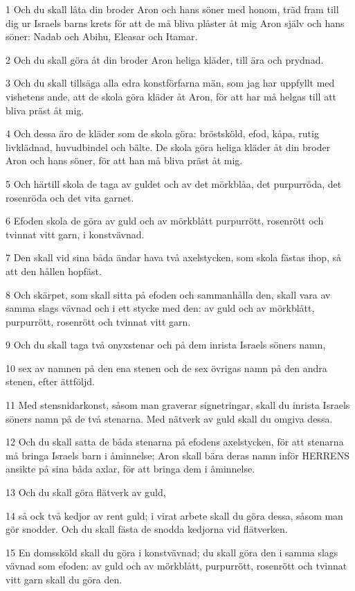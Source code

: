 \par 1 Och du skall låta din broder Aron och hans söner med honom, träd fram till dig ur Israels barns krets för att de må bliva plåster åt mig Aron själv och hans söner: Nadab och Abihu, Eleasar och Itamar.
\par 2 Och du skall göra åt din broder Aron heliga kläder, till ära och prydnad.
\par 3 Och du skall tillsäga alla edra konstförfarna män, som jag har uppfyllt med vishetens ande, att de skola göra kläder åt Aron, för att har må helgas till att bliva präst åt mig.
\par 4 Och dessa äro de kläder som de skola göra: bröstsköld, efod, kåpa, rutig livklädnad, huvudbindel och bälte. De skola göra heliga kläder åt din broder Aron och hans söner, för att han må bliva präst åt mig.
\par 5 Och härtill skola de taga av guldet och av det mörkblåa, det purpurröda, det rosenröda och det vita garnet.
\par 6 Efoden skola de göra av guld och av mörkblått purpurrött, rosenrött och tvinnat vitt garn, i konstvävnad.
\par 7 Den skall vid sina båda ändar hava två axelstycken, som skola fästas ihop, så att den hållen hopfäst.
\par 8 Och skärpet, som skall sitta på efoden och sammanhålla den, skall vara av samma slags vävnad och i ett stycke med den: av guld och av mörkblått, purpurrött, rosenrött och tvinnat vitt garn.
\par 9 Och du skall taga två onyxstenar och på dem inrista Israels söners namn,
\par 10 sex av namnen på den ena stenen och de sex övrigas namn på den andra stenen, efter ättföljd.
\par 11 Med stensnidarkonst, såsom man graverar signetringar, skall du inrista Israels söners namn på de två stenarna. Med nätverk av guld skall du omgiva dessa.
\par 12 Och du skall satta de båda stenarna på efodens axelstycken, för att stenarna må bringa Israels barn i åminnelse; Aron skall bära deras namn inför HERRENS ansikte på sina båda axlar, för att bringa dem i åminnelse.
\par 13 Och du skall göra flätverk av guld,
\par 14 så ock två kedjor av rent guld; i virat arbete skall du göra dessa, såsom man gör snodder. Och du skall fästa de snodda kedjorna vid flätverken.
\par 15 En domssköld skall du göra i konstvävnad; du skall göra den i samma slags vävnad som efoden: av guld och av mörkblått, purpurrött, rosenrött och tvinnat vitt garn skall du göra den.
